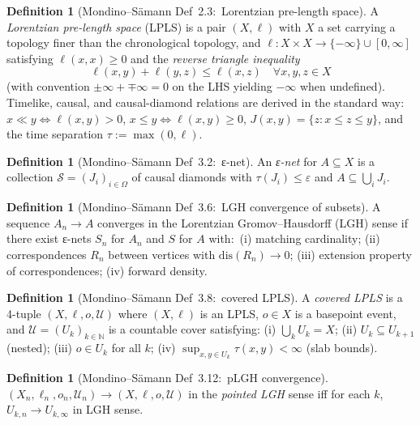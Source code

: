 \documentclass[11pt,a4paper]{article}
\theoremstyle{plain}
\theoremstyle{definition}
\newtheorem{definition}[theorem]{Definition}
\newcommand{\Ucal}{\mathcal{U}}
\newcommand{\N}{\mathbb{N}}
\begin{document}
\begin{definition}[Mondino--S\"amann Def~2.3:\ Lorentzian pre-length
space]\label{def:lpls}
A \emph{Lorentzian pre-length space} (LPLS) is a pair $(X, \ell)$
with $X$ a set carrying a topology finer than the chronological
topology, and $\ell: X \times X \to \{-\infty\} \cup [0, \infty]$
satisfying $\ell(x, x) \ge 0$ and the \emph{reverse triangle
inequality}
\begin{equation}\label{eq:reverse_triangle}
\ell(x, y) + \ell(y, z) \le \ell(x, z) \quad \forall x, y, z \in X
\end{equation}
(with convention $\pm\infty + \mp\infty = 0$ on the LHS yielding
$-\infty$ when undefined). Timelike, causal, and causal-diamond
relations are derived in the standard way:\ $x \ll y \iff \ell(x, y) > 0$,
$x \le y \iff \ell(x, y) \ge 0$, $J(x, y) = \{z : x \le z \le y\}$,
and the time separation $\tau := \max(0, \ell)$.
\end{definition}

\begin{definition}[Mondino--S\"amann Def~3.2:\ ε-net]\label{def:eps_net}
An \emph{ε-net} for $A \subseteq X$ is a collection
$\mathcal{S} = (J_{i})_{i \in \Omega}$ of causal diamonds with
$\tau(J_{i}) \le \varepsilon$ and $A \subseteq \bigcup_{i} J_{i}$.
\end{definition}

\begin{definition}[Mondino--S\"amann Def~3.6:\ LGH convergence of
subsets]\label{def:lgh_convergence}
A sequence $A_{n} \to A$ converges in the Lorentzian
Gromov--Hausdorff (LGH) sense if there exist ε-nets $S_{n}$ for
$A_{n}$ and $S$ for $A$ with:\
(i) matching cardinality;
(ii) correspondences $R_{n}$ between vertices with $\mathrm{dis}(R_{n})
\to 0$;
(iii) extension property of correspondences;
(iv) forward density.
\end{definition}

\begin{definition}[Mondino--S\"amann Def~3.8:\ covered LPLS]\label{def:covered_lpls}
A \emph{covered LPLS} is a 4-tuple $(X, \ell, o, \Ucal)$ where
$(X, \ell)$ is an LPLS, $o \in X$ is a basepoint event, and
$\Ucal = (U_{k})_{k \in \N}$ is a countable cover satisfying:
(i) $\bigcup_{k} U_{k} = X$;
(ii) $U_{k} \subseteq U_{k+1}$ (nested);
(iii) $o \in U_{k}$ for all $k$;
(iv) $\sup_{x, y \in U_{k}} \tau(x, y) < \infty$ (slab bounds).
\end{definition}

\begin{definition}[Mondino--S\"amann Def~3.12:\ pLGH
convergence]\label{def:plgh}
$(X_{n}, \ell_{n}, o_{n}, \Ucal_{n}) \to (X, \ell, o, \Ucal)$ in the
\emph{pointed LGH} sense iff for each $k$, $U_{k, n} \to U_{k, \infty}$
in LGH sense.
\end{definition}
\end{document}
